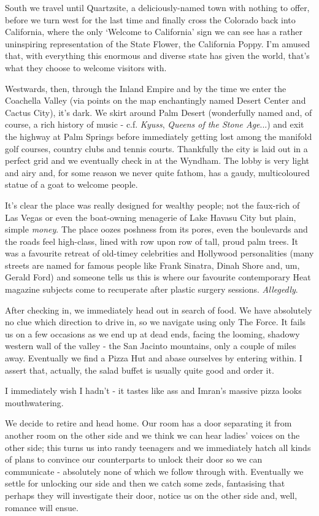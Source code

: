 \documentclass[a5paper,titlepage,11pt,draft]{book}
\begin{document}
South we travel until Quartzsite, a deliciously-named town with nothing to offer, before we turn west for the last time and finally cross the Colorado back into California, where the only `Welcome to California' sign we can see has a rather uninspiring representation of the State Flower, the California Poppy.  I'm amused that, with everything this enormous and diverse state has given the world, that's what they choose to welcome visitors with.

Westwards, then, through the Inland Empire and by the time we enter the Coachella Valley (via points on the map enchantingly named Desert Center and Cactus City), it's dark.  We skirt around Palm Desert (wonderfully named and, of course, a rich history of music - c.f. \emph{Kyuss}, \emph{Queens of the Stone Age}...) and exit the highway at Palm Springs before immediately getting lost among the manifold golf courses, country clubs and tennis courts.  Thankfully the city is laid out in a perfect grid and we eventually check in at the Wyndham.  The lobby is very light and airy and, for some reason we never quite fathom, has a gaudy, multicoloured statue of a goat to welcome people.

It's clear the place was really designed for wealthy people; not the faux-rich of Las Vegas or even the boat-owning menagerie of Lake Havasu City but plain, simple \emph{money}.  The place oozes poshness from its pores, even the boulevards and the roads feel high-class, lined with row upon row of tall, proud palm trees.  It was a favourite retreat of old-timey celebrities and Hollywood personalities (many streets are named for famous people like Frank Sinatra, Dinah Shore and, um, Gerald Ford) and someone tells us this is where our favourite contemporary Heat magazine subjects come to recuperate after plastic surgery sessions.  \emph{Allegedly}.

After checking in, we immediately head out in search of food.  We have absolutely no clue which direction to drive in, so we navigate using only The Force.  It fails us on a few occasions as we end up at dead ends, facing the looming, shadowy western wall of the valley - the San Jacinto mountains, only a couple of miles away.  Eventually we find a Pizza Hut and abase ourselves by entering within.  I assert that, actually, the salad buffet is usually quite good and order it.

I immediately wish I hadn't - it tastes like ass and Imran's massive pizza looks mouthwatering.

We decide to retire and head home.  Our room has a door separating it from another room on the other side and we think we can hear ladies' voices on the other side; this turns us into randy teenagers and we immediately hatch all kinds of plans to convince our counterparts to unlock their door so we can communicate - absolutely none of which we follow through with.  Eventually we settle for unlocking our side and then we catch some zeds, fantasising that perhaps they will investigate their door, notice us on the other side and, well, romance will ensue.
\end{document}
